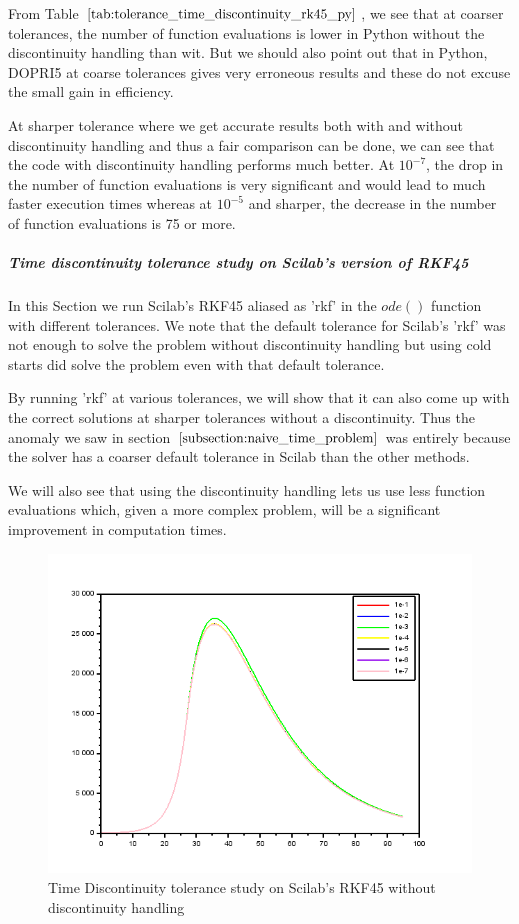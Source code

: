 From Table $\ref{tab:tolerance_time_discontinuity_rk45_py}$, we see that at coarser tolerances, the number of function evaluations is lower in Python without the discontinuity handling than wit. But we should also point out that in Python, DOPRI5 at coarse tolerances gives very erroneous results and these do not excuse the small gain in efficiency.

At sharper tolerance where we get accurate results both with and without discontinuity handling and thus a fair comparison can be done, we can see that the code with discontinuity handling performs much better. At $10^{-7}$, the drop in the number of function evaluations is very significant and would lead to much faster execution times whereas at $10^{-5}$ and sharper, the decrease in the number of function evaluations is 75 or more.

\subparagraph{Time discontinuity tolerance study on Scilab's version of RKF45}
In this Section we run Scilab's RKF45 aliased as 'rkf' in the $ode()$ function with different tolerances. We note that the default tolerance for Scilab's 'rkf' was not enough to solve the problem without discontinuity handling but using cold starts did solve the problem even with that default tolerance. 

By running 'rkf' at various tolerances, we will show that it can also come up with the correct solutions at sharper tolerances without a discontinuity. Thus the anomaly we saw in section $\ref{subsection:naive_time_problem}$ was entirely because the solver has a coarser default tolerance in Scilab than the other methods.

We will also see that using the discontinuity handling lets us use less function evaluations which, given a more complex problem, will be a significant improvement in computation times.

\begin{figure}[h]
	\centering
	\includegraphics[width=0.7\linewidth]{./figures/tolerance_time_rk45_no_event_sci}
	\caption{Time Discontinuity tolerance study on Scilab's RKF45 without discontinuity handling}
	\label{fig:tolerance_time_rk45_no_event_sci}
\end{figure}

